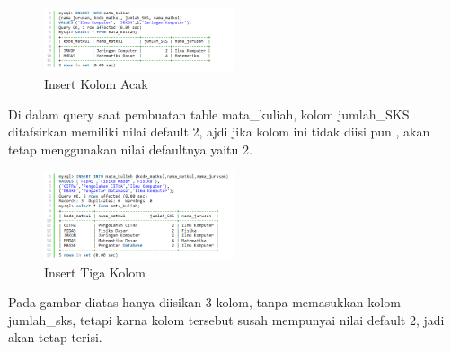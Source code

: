 		\begin{figure}[ht]
			\centerline{\includegraphics[width=0.5\textwidth]{figures/insert4.png}}
			\caption{Insert Kolom Acak}
			\label{insert4}
			\end{figure}
	
	Di dalam query saat pembuatan table mata_kuliah, kolom jumlah_SKS ditafsirkan memiliki nilai default 2, ajdi jika kolom ini tidak diisi pun , akan tetap menggunakan nilai defaultnya yaitu 2.
	
		\begin{figure}[ht]
			\centerline{\includegraphics[width=0.5\textwidth]{figures/insert5.png}}
			\caption{Insert Tiga Kolom}
			\label{insert5}
			\end{figure}
			
	Pada gambar diatas hanya diisikan 3 kolom, tanpa memasukkan kolom jumlah_sks, tetapi karna kolom tersebut susah mempunyai nilai default 2, jadi akan tetap terisi.